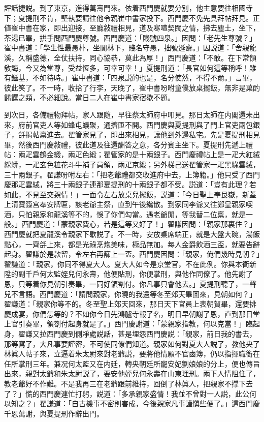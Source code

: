 評話捷説。到了東京，進得萬壽門來。依着西門慶就要分別，他主意要往相國寺下；夏提刑不肯，堅執要請往他令親崔中書家投下。西門慶不免先具拜帖拜見。正値崔中書在家，即出迎接，至廳敍禮相見，道及寒喧契闊之情，拂去塵土，坐下，茶湯已畢，拱手問西門慶尊號。西門慶道：「賤號四泉。」因問：「老先生尊號？」崔中書道：「學生性最愚朴，坐閒林下，賤名守愚，拙號遜齋。」因説道：「舍親龍溪，久稱盛德，全仗扶持，同心協恭，莫此為厚！」西門慶道：「不敢。在下常領敎誨，今又為堂尊，受益恆多，可幸可幸！」夏提刑道：「長官如何這等稱呼！雖有鎡基，不如待時。」崔中書道：「四泉説的也是，名分使然，不得不爾。」言畢，彼此笑了。不一時，收拾了行李，天晚了，崔中書吩咐童僕放桌擺飯，無非是菓酌餚饌之類，不必細說。當日二人在崔中書家宿歇不題。

到次日，各備禮物拜帖，家人跟隨，早往蔡太師府中叩見。那日太師在内閣還未出來，府前官吏人等如蜂屯蟻聚，通擠匝不開。西門慶與夏提刑與了門上官吏兩包銀子，㧱揭帖禀進去。翟管家見了，即出來相見，讓他到外邊私宅。先是夏提刑相見畢，然後西門慶敍禮，彼此道及往還酬答之意，各分賓主坐下。夏提刑先遞上禮帖：兩疋雲鶴金緞，兩疋色緞；翟管家的是十兩銀子。西門慶禮帖上是一疋大紅絨綵蟒，一疋玄色粧花斗牛補子員領，兩疋京緞；另外梯己送翟管家一疋黑綠雲絨，三十兩銀子。翟謙吩咐左右：「把老爺禮都交收進府中去，上簿籍。」他只受了西門慶那疋雲絨，將三十兩銀子連那夏提刑的十兩銀子都不受。説道：「豈有此理？若如此，不見至交親情！」一面令左右放桌兒擺飯，説道：「今日聖上奉艮嶽，新蓋上清寳籙宫奉安牌匾，該老爺主祭，直到午後纔散。到家同李爺又往鄭皇親家喫酒，只怕親家和龍溪等不的，悞了你們勾當。遇老爺閒，等我替二位禀，就是一般。」西門慶道：「蒙親家費心，若是這等又好了！」翟謙因問：「親家那裏住？」西門慶就把夏龍溪令親家下歇説了。不一時，安放桌席端正，就是大盤大碗，湯飯點心，一齊㧱上來，都是光祿烹炮美味，極品無加。每人金爵飲酒三盃，就要告辭起身。翟謙於是款留，令左右再篩上一盃。西門慶因問：「親家，俺們幾時見朝？」翟謙道：「親家，你同不得夏大人。夏大人如今是京堂官，不在此例。你與本衛新陞的副千戶何太監姪兒何永壽，他便貼刑，你便掌刑，與他作同僚了。他先謝了恩，只等着你見朝引奏畢，一同好領劄付。你凡事只會他去。」夏提刑聽了，一聲兒不言語。西門慶道：「請問親家，你曉的我還等冬至郊天畢囬來，見朝如何？」翟謙道：「親家你等不的。冬至聖上郊天回來，那日天下官員上表朝賀畢，還要排慶成宴，你們怎等的？不如你今日先鴻臚寺報了名，明日早朝謝了恩，直到那日堂上官引奏畢，領劄付起身就是了。」西門慶謝道：「蒙親家指教，何以克當！」臨起身，翟謙又拉西門慶到側凈處説話，甚是埋怨西門慶説：「親家，前日我的書去，那等寫了，大凡事要謹密，不可使同僚們知道。親家如何對夏大人説了，教他央了林眞人帖子來，立逼着朱太尉來對老爺説，要將他情願不官鹵簿，仍以指揮職銜在任所掌刑三年。兼况何太監又在内廷，轉央朝廷所寵安妃劉娘娘的分上，便也傳旨出來，親對太爺和朱太尉説了，要安他姪兒何永壽在山東理刑。兩下人情阻住了，教老爺好不作難。不是我再三在老爺跟前維持，回倒了林眞人，把親家不撑下去了？」慌的西門慶連忙打躬，説道：「多承親家盛情！我並不曾對一人説，此公何以知之？」翟謙道：「自古機事不密則害成，今後親家凡事謹愼些便了。」這西門慶千恩萬謝，與夏提刑作辭出門。

